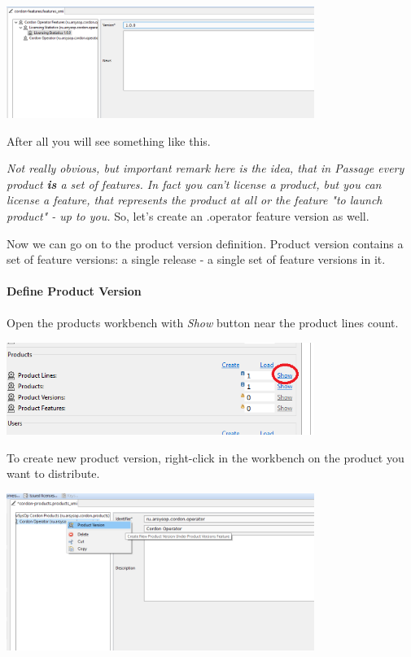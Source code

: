 \documentclass[12pt]{report}
\begin{document}
\begin{center}
    \includegraphics[width=0.75\textwidth]{feature_version_created}
\end{center}

After all you will see something like this.

\textit{Not really obvious, but important remark here is the idea, that in Passage every product \textbf{is} a set of features. In fact you can't license a product,
    but you can license a feature, that represents the product at all or the feature "to launch product" - up to you.} So, let's create an .operator feature version as well.

Now we can go on to the product version definition. Product version contains a set of feature versions: a single release - a single set of feature versions in it.

\paragraph*{Define Product Version}
\paragraph*{}

Open the products workbench with \textit{Show} button near the product lines count.

\begin{center}
    \includegraphics[width=0.75\textwidth]{product_line_show}
\end{center}

To create new product version, right-click in the workbench on the product you want to distribute.

\begin{center}
    \includegraphics[width=0.75\textwidth]{product_version_create}
\end{center}
\end{document}
